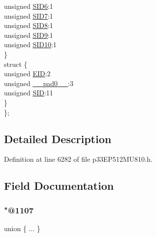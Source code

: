 \begin{DoxyCompactItemize}
\begin{tabbing}
\>\>unsigned \hyperlink{structtag_c2_r_x_f2_s_i_d_b_i_t_s_a70d70952133eb2389d5c326f9f0e8035}{SID6}:1\\
\>\>unsigned \hyperlink{structtag_c2_r_x_f2_s_i_d_b_i_t_s_a34097fb76decd431701fa2d86a22328e}{SID7}:1\\
\>\>unsigned \hyperlink{structtag_c2_r_x_f2_s_i_d_b_i_t_s_afe74894633244fdb0b0c01b4e8c522e7}{SID8}:1\\
\>\>unsigned \hyperlink{structtag_c2_r_x_f2_s_i_d_b_i_t_s_a33587704948067005c2a6a3ccc503c99}{SID9}:1\\
\>\>unsigned \hyperlink{structtag_c2_r_x_f2_s_i_d_b_i_t_s_a1a9084031c7f5fb16007feeebf0d8216}{SID10}:1\\
\>\} \\
\>struct \{\\
\>\>unsigned \hyperlink{structtag_c2_r_x_f2_s_i_d_b_i_t_s_ae80b378c9141f7c03e0b4e55b5f4b54d}{EID}:2\\
\>\>unsigned \hyperlink{structtag_c2_r_x_f2_s_i_d_b_i_t_s_adf71f3d8410c1f1dbbc96680a92c49af}{\_\_pad0\_\_}:3\\
\>\>unsigned \hyperlink{structtag_c2_r_x_f2_s_i_d_b_i_t_s_af88edf93b2fee2432665bd84f51287e4}{SID}:11\\
\>\} \\
\}; \\

\end{tabbing}\end{DoxyCompactItemize}


\subsection{Detailed Description}


Definition at line 6282 of file p33\+E\+P512\+M\+U810.\+h.



\subsection{Field Documentation}
\mbox{\label{structtag_c2_r_x_f2_s_i_d_b_i_t_s_aeb355e8d717791af8ac409d6ce7f2381}} 
\subsubsection{\texorpdfstring{"@1107}{@1107}}
{\footnotesize\ttfamily union \{ ... \} }

\mbox{\label{structtag_c2_r_x_f2_s_i_d_b_i_t_s_adf71f3d8410c1f1dbbc96680a92c49af}} 
